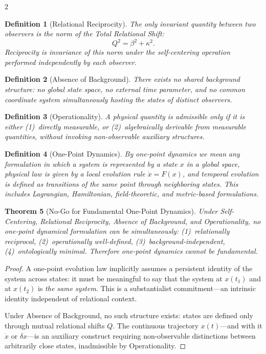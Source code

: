 \documentclass[10pt, a4paper]{article}
\newtheorem{theorem}{Theorem}[section]
\newtheorem{definition}[theorem]{Definition}
\begin{document}
\begin{multicols}{2}
\begin{definition}[Relational Reciprocity]
The only invariant quantity between two observers is the norm of the Total Relational Shift:
\[
Q^2=\beta^2+\kappa^2.
\]
Reciprocity is invariance of this norm under the self-centering operation performed independently by each observer.
\end{definition}

\begin{definition}[Absence of Background]
There exists no shared background structure: no global state space, no external time parameter, and no common coordinate system simultaneously hosting the states of distinct observers.
\end{definition}

\begin{definition}[Operationality]
A physical quantity is admissible only if it is either (1)~directly measurable, or (2)~algebraically derivable from measurable quantities, without invoking non-observable auxiliary structures.
\end{definition}

\begin{definition}[One-Point Dynamics]
By one-point dynamics we mean any formulation in which a system is represented by a state $x$ in a global space, physical law is given by a local evolution rule $\dot{x}=F(x)$, and temporal evolution is defined as transitions of the same point through neighboring states. This includes Lagrangian, Hamiltonian, field-theoretic, and metric-based formulations.
\end{definition}

\begin{theorem}[No-Go for Fundamental One-Point Dynamics]
Under Self-Centering, Relational Reciprocity, Absence of Background, and Operationality, no one-point dynamical formulation can be simultaneously: (1)~relationally reciprocal, (2)~operationally well-defined, (3)~background-independent, (4)~ontologically minimal. Therefore one-point dynamics cannot be fundamental.
\end{theorem}

\begin{proof}
A one-point evolution law implicitly assumes a persistent identity of the system across states: it must be meaningful to say that the system at $x(t_1)$ and at $x(t_2)$ is \emph{the same system}. This is a substantialist commitment---an intrinsic identity independent of relational context.

Under Absence of Background, no such structure exists: states are defined only through mutual relational shifts $Q$. The continuous trajectory $x(t)$---and with it $\dot{x}$ or $\delta x$---is an auxiliary construct requiring non-observable distinctions between arbitrarily close states, inadmissible by Operationality.


\end{proof}
\end{multicols}
\end{document}
